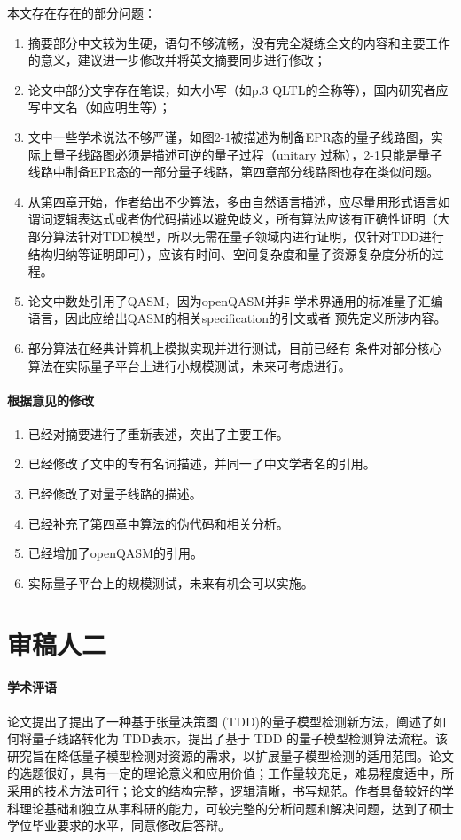 \documentclass[10.5pt]{article} %
\begin{document}
本文存在存在的部分问题：
\begin{enumerate}
    \item 摘要部分中文较为生硬，语句不够流畅，没有完全凝练全文的内容和主要工作的意义，建议进一步修改并将英文摘要同步进行修改；
    \item 论文中部分文字存在笔误，如大小写（如p.3 QLTL的全称等），国内研究者应写中文名（如应明生等）；
    \item 文中一些学术说法不够严谨，如图2-1被描述为制备EPR态的量子线路图，实际上量子线路图必须是描述可逆的量子过程（unitary 过称），2-1只能是量子线路中制备EPR态的一部分量子线路，第四章部分线路图也存在类似问题。
    \item 从第四章开始，作者给出不少算法，多由自然语言描述，应尽量用形式语言如谓词逻辑表达式或者伪代码描述以避免歧义，所有算法应该有正确性证明（大部分算法针对TDD模型，所以无需在量子领域内进行证明，仅针对TDD进行结构归纳等证明即可），应该有时间、空间复杂度和量子资源复杂度分析的过程。
    \item 论文中数处引用了QASM，因为openQASM并非
    学术界通用的标准量子汇编语言，因此应给出QASM的相关specification的引文或者
    预先定义所涉内容。
    \item 部分算法在经典计算机上模拟实现并进行测试，目前已经有
    条件对部分核心算法在实际量子平台上进行小规模测试，未来可考虑进行。
\end{enumerate}
\paragraph{根据意见的修改}
\begin{enumerate}
    \item 已经对摘要进行了重新表述，突出了主要工作。
    \item 已经修改了文中的专有名词描述，并同一了中文学者名的引用。
    \item 已经修改了对量子线路的描述。
    \item 已经补充了第四章中算法的伪代码和相关分析。
    \item 已经增加了openQASM的引用。
    \item 实际量子平台上的规模测试，未来有机会可以实施。
\end{enumerate}
\section*{审稿人二}
\paragraph{学术评语}
论文提出了提出了一种基于张量决策图 (TDD)的量子模型检测新方法，阐述了如何将量子线路转化为 TDD表示，提出了基于 TDD 的量子模型检测算法流程。该研究旨在降低量子模型检测对资源的需求，以扩展量子模型检测的适用范围。论文的选题很好，具有一定的理论意义和应用价值；工作量较充足，难易程度适中，所采用的技术方法可行；论文的结构完整，逻辑清晰，书写规范。作者具备较好的学科理论基础和独立从事科研的能力，可较完整的分析问题和解决问题，达到了硕士学位毕业要求的水平，同意修改后答辩。
\end{document}
